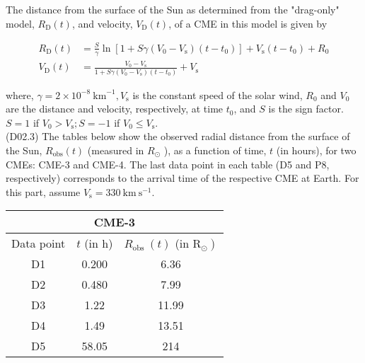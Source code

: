 \documentclass[10pt]{article}
\begin{document}
    The distance from the surface of the Sun as determined from the "drag-only" model, $R_{\mathrm{D}}(t)$, and velocity, $V_{\mathrm{D}}(t)$, of a CME in this model is given by
    
    $$
    \begin{aligned}
    R_{\mathrm{D}}(t) & =\frac{S}{\gamma} \ln \left[1+S \gamma\left(V_{0}-V_{\mathrm{s}}\right)\left(t-t_{0}\right)\right]+V_{\mathrm{s}}\left(t-t_{0}\right)+R_{0} \\
    V_{\mathrm{D}}(t) & =\frac{V_{0}-V_{\mathrm{s}}}{1+S \gamma\left(V_{0}-V_{\mathrm{s}}\right)\left(t-t_{0}\right)}+V_{\mathrm{s}}
    \end{aligned}
    $$
    
    where, $\gamma=2 \times 10^{-8} \mathrm{~km}^{-1}, V_{\mathrm{s}}$ is the constant speed of the solar wind, $R_{0}$ and $V_{0}$ are the distance and velocity, respectively, at time $t_{0}$, and $S$ is the sign factor. $S=1$ if $V_{0}>V_{\mathrm{s}} ; S=-1$ if $V_{0} \leq V_{\mathrm{s}}$.\\
    (D02.3) The tables below show the observed radial distance from the surface of the Sun, $R_{\mathrm{obs}}(t)$ (measured in $R_{\odot}$ ), as a function of time, $t$ (in hours), for two CMEs: CME-3 and CME-4. The last data point in each table (D5 and P8, respectively) corresponds to the arrival time of the respective CME at Earth. For this part, assume $V_{\mathrm{s}}=330 \mathrm{~km} \mathrm{~s}^{-1}$.
    
    \begin{center}
    \begin{tabular}{|c|c|c|}
    \hline
    \multicolumn{3}{|c|}{CME-3} \\
    \hline
    Data point & $t$ (in h) & $R_{\text {obs }}(t)$ (in $\left.\mathrm{R}_{\odot}\right)$ \\
    \hline
    D1 & 0.200 & 6.36 \\
    \hline
    D2 & 0.480 & 7.99 \\
    \hline
    D3 & 1.22 & 11.99 \\
    \hline
    D4 & 1.49 & 13.51 \\
    \hline
    D5 & 58.05 & 214 \\
    \hline
    \end{tabular}
    \end{center}
    
\end{document}

